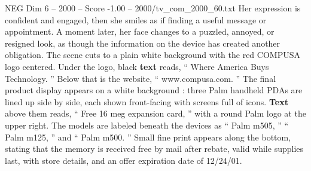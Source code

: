 \begin{textsample}{NEG Dim 6 – 2000 – Score -1.00 – 2000/tv\_com\_2000\_60.txt}
Her expression is confident and engaged, then she smiles as if finding a useful message or appointment.
A moment later, her face changes to a puzzled, annoyed, or resigned look, as though the information on the device has created another obligation.
The scene cuts to a plain white background with the red COMPUSA logo centered.
Under the logo, black \textbf{text} reads, “ Where America Buys Technology. ” Below that is the website, “ www.compusa.com. ” The final product display appears on a white background : three Palm handheld PDAs are lined up side by side, each shown front-facing with screens full of icons. \textbf{Text} above them reads, “ Free 16 meg expansion card, ” with a round Palm logo at the upper right.
The models are labeled beneath the devices as “ Palm m505, ” “ Palm m125, ” and “ Palm m500. ” Small fine print appears along the bottom, stating that the memory is received free by mail after rebate, valid while supplies last, with store details, and an offer expiration date of 12/24/01.

\end{textsample}
